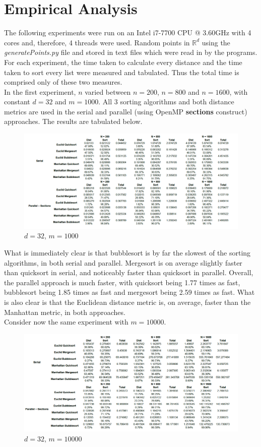 \documentclass[10pt]{article}
\begin{document}
\section{Empirical Analysis}
The following experiments were run on an Intel i7-7700 CPU @ 3.60GHz with 4 cores and, therefore, 4 threads were used. Random points in $\mathbb{R}^{d}$ using the \textit{generatePoints.py} file and stored in text files which were read in by the programs. For each experiment, the time taken to calculate every distance and the time taken to sort every list were measured and tabulated. Thus the total time is comprised only of these two measures.
\\
In the first experiment, $n$ varied between $n = 200$, $n = 800$ and $n = 1600$, with constant $d = 32$ and $m = 1000$. All 3 sorting algorithms and both distance metrics are used in the serial and parallel (using OpenMP \textbf{sections} construct) approaches. The results are tabulated below.
\begin{figure}[H]
\caption{$d = 32$, $m = 1000$}
\centering
\includegraphics[scale=0.5]{d32m1000.png}
\end{figure}
What is immediately clear is that bubblesort is by far the slowest of the sorting algorithms, in both serial and parallel. Mergesort is on average slightly faster than quicksort in serial, and noticeably faster than quicksort in parallel. Overall, the parallel approach is much faster, with quicksort being 1.77 times as fast, bubblesort being 1.85 times as fast and mergesort being 2.59 times as fast. What is also clear is that the Euclidean distance metric is, on average, faster than the Manhattan metric, in both approaches.
\\
Consider now the same experiment with $m=10 000$.
\begin{figure}[H]
\caption{$d = 32$, $m = 10000$}
\centering
\includegraphics[scale=0.5]{d32m10000.png}
\end{figure}
\end{document}
